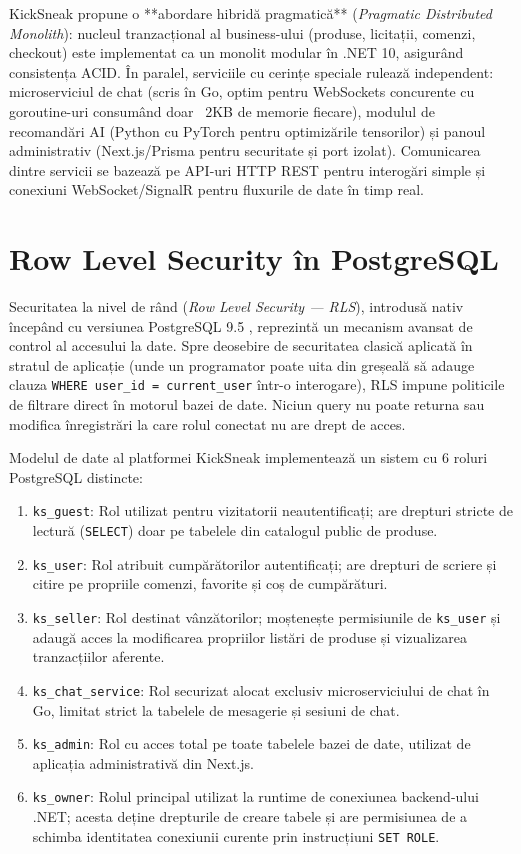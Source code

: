 KickSneak propune o **abordare hibridă pragmatică** (\textit{Pragmatic Distributed Monolith}): nucleul tranzacțional al business-ului (produse, licitații, comenzi, checkout) este implementat ca un monolit modular în .NET 10, asigurând consistența ACID. În paralel, serviciile cu cerințe speciale rulează independent: microserviciul de chat (scris în Go, optim pentru WebSockets concurente cu goroutine-uri consumând doar ~2KB de memorie fiecare), modulul de recomandări AI (Python cu PyTorch pentru optimizările tensorilor) și panoul administrativ (Next.js/Prisma pentru securitate și port izolat). Comunicarea dintre servicii se bazează pe API-uri HTTP REST pentru interogări simple și conexiuni WebSocket/SignalR pentru fluxurile de date în timp real.

\section{Row Level Security în PostgreSQL}

Securitatea la nivel de rând (\textit{Row Level Security --- RLS}), introdusă nativ începând cu versiunea PostgreSQL 9.5 \cite{postgresql2026rls}, reprezintă un mecanism avansat de control al accesului la date. Spre deosebire de securitatea clasică aplicată în stratul de aplicație (unde un programator poate uita din greșeală să adauge clauza \texttt{WHERE user\_id = current\_user} într-o interogare), RLS impune politicile de filtrare direct în motorul bazei de date. Niciun query nu poate returna sau modifica înregistrări la care rolul conectat nu are drept de acces.

Modelul de date al platformei KickSneak implementează un sistem cu 6 roluri PostgreSQL distincte:
\begin{enumerate}
    \item \texttt{ks\_guest}: Rol utilizat pentru vizitatorii neautentificați; are drepturi stricte de lectură (\texttt{SELECT}) doar pe tabelele din catalogul public de produse.
    \item \texttt{ks\_user}: Rol atribuit cumpărătorilor autentificați; are drepturi de scriere și citire pe propriile comenzi, favorite și coș de cumpărături.
    \item \texttt{ks\_seller}: Rol destinat vânzătorilor; moștenește permisiunile de \texttt{ks\_user} și adaugă acces la modificarea propriilor listări de produse și vizualizarea tranzacțiilor aferente.
    \item \texttt{ks\_chat\_service}: Rol securizat alocat exclusiv microserviciului de chat în Go, limitat strict la tabelele de mesagerie și sesiuni de chat.
    \item \texttt{ks\_admin}: Rol cu acces total pe toate tabelele bazei de date, utilizat de aplicația administrativă din Next.js.
    \item \texttt{ks\_owner}: Rolul principal utilizat la runtime de conexiunea backend-ului .NET; acesta deține drepturile de creare tabele și are permisiunea de a schimba identitatea conexiunii curente prin instrucțiuni \texttt{SET ROLE}.
\end{enumerate}

